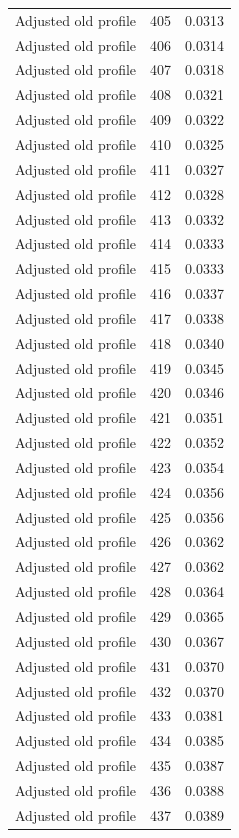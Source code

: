 \begin{table}[htbp]
\begin{tabular}{lll}
Adjusted old profile & 405 & 0.0313 \\
Adjusted old profile & 406 & 0.0314 \\
Adjusted old profile & 407 & 0.0318 \\
Adjusted old profile & 408 & 0.0321 \\
Adjusted old profile & 409 & 0.0322 \\
Adjusted old profile & 410 & 0.0325 \\
Adjusted old profile & 411 & 0.0327 \\
Adjusted old profile & 412 & 0.0328 \\
Adjusted old profile & 413 & 0.0332 \\
Adjusted old profile & 414 & 0.0333 \\
Adjusted old profile & 415 & 0.0333 \\
Adjusted old profile & 416 & 0.0337 \\
Adjusted old profile & 417 & 0.0338 \\
Adjusted old profile & 418 & 0.0340 \\
Adjusted old profile & 419 & 0.0345 \\
Adjusted old profile & 420 & 0.0346 \\
Adjusted old profile & 421 & 0.0351 \\
Adjusted old profile & 422 & 0.0352 \\
Adjusted old profile & 423 & 0.0354 \\
Adjusted old profile & 424 & 0.0356 \\
Adjusted old profile & 425 & 0.0356 \\
Adjusted old profile & 426 & 0.0362 \\
Adjusted old profile & 427 & 0.0362 \\
Adjusted old profile & 428 & 0.0364 \\
Adjusted old profile & 429 & 0.0365 \\
Adjusted old profile & 430 & 0.0367 \\
Adjusted old profile & 431 & 0.0370 \\
Adjusted old profile & 432 & 0.0370 \\
Adjusted old profile & 433 & 0.0381 \\
Adjusted old profile & 434 & 0.0385 \\
Adjusted old profile & 435 & 0.0387 \\
Adjusted old profile & 436 & 0.0388 \\
Adjusted old profile & 437 & 0.0389 \\

\end{tabular}
\end{table}
